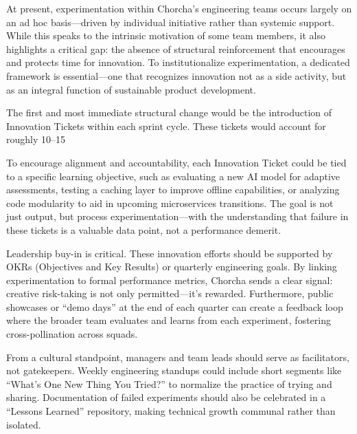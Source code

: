 \documentclass[12pt,a4paper,oneside]{book}
\begin{document}
At present, experimentation within Chorcha’s engineering teams occurs largely on an ad hoc basis—driven by individual initiative rather than systemic support. While this speaks to the intrinsic motivation of some team members, it also highlights a critical gap: the absence of structural reinforcement that encourages and protects time for innovation. To institutionalize experimentation, a dedicated framework is essential—one that recognizes innovation not as a side activity, but as an integral function of sustainable product development.

The first and most immediate structural change would be the introduction of Innovation Tickets within each sprint cycle. These tickets would account for roughly 10–15%

To encourage alignment and accountability, each Innovation Ticket could be tied to a specific learning objective, such as evaluating a new AI model for adaptive assessments, testing a caching layer to improve offline capabilities, or analyzing code modularity to aid in upcoming microservices transitions. The goal is not just output, but process experimentation—with the understanding that failure in these tickets is a valuable data point, not a performance demerit.

Leadership buy-in is critical. These innovation efforts should be supported by OKRs (Objectives and Key Results) or quarterly engineering goals. By linking experimentation to formal performance metrics, Chorcha sends a clear signal: creative risk-taking is not only permitted—it’s rewarded. Furthermore, public showcases or “demo days” at the end of each quarter can create a feedback loop where the broader team evaluates and learns from each experiment, fostering cross-pollination across squads.

From a cultural standpoint, managers and team leads should serve as facilitators, not gatekeepers. Weekly engineering standups could include short segments like “What’s One New Thing You Tried?” to normalize the practice of trying and sharing. Documentation of failed experiments should also be celebrated in a “Lessons Learned” repository, making technical growth communal rather than isolated.
\end{document}
